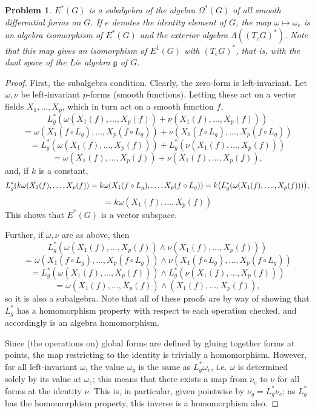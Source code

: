 \documentclass{article}
\newtheorem{plm}{Problem}
\begin{document}

\begin{plm}
  $E^{*}(G)$ is a subalgebra of the algebra $\Omega^{*}(G)$ of all smooth differential forms on $G$.
  If $e$ denotes the identity element of $G$, the map $\omega \mapsto \omega_{e}$ is an algebra isomorphism of $E^{*}(G)$
  and the exterior algebra $\Lambda((T_{e}G)^{*})$.
  Note that this map gives an isomorphism of $E^{1}(G)$ with $(T_{e}G)^{*}$, that is, with the dual space of the Lie algebra $\mathfrak{g}$
  of $G$.
\end{plm}

\begin{proof}
  First, the subalgebra condition.
  Clearly, the zero-form is left-invariant.
  Let $\omega, \nu$ be left-invariant $p$-forms (smooth functions).
  Letting these act on a vector fields $X_{1}, \ldots, X_{p}$, which in turn act on a smooth function $f$,
  \[
    L_{g}^{*}(\omega(X_{1}(f), \ldots, X_{p}(f)) + \nu(X_{1}(f), \ldots, X_{p}(f)))
  \]
  \[
    = \omega(X_{1}(f \circ L_{g}), \ldots, X_{p}(f \circ L_{g})) + \nu(X_{1}(f \circ L_{g}), \ldots, X_{p}(f \circ L_{g}))
  \]
  \[
    = L_{g}^{*}(\omega(X_{1}(f), \ldots, X_{p}(f))) + L_{g}^{*}(\nu(X_{1}(f), \ldots, X_{p}(f)))
  \]
  \[
    = \omega(X_{1}(f), \ldots, X_{p}(f)) + \nu(X_{1}(f), \ldots, X_{p}(f)),
  \]
  and, if $k$ is a constant,
  \[
    L_{g}^{*}(k\omega(X_{1}(f), \ldots, X_{p}(f))
    = k\omega(X_{1}(f \circ L_{g}), \ldots, X_{p}(f \circ L_{g}))
    = k\qty(L_{g}^{*}(\omega(X_{1}(f), \ldots, X_{p}(f))));
  \]
  \[
    = k\omega(X_{1}(f), \ldots, X_{p}(f))
  \]
  This shows that $E^{*}(G)$ is a vector subspace.

  Further, if $\omega, \nu$ are as above,
  then
  \[
    L_{g}^{*}(\omega(X_{1}(f), \ldots, X_{p}(f)) \wedge \nu(X_{1}(f), \ldots, X_{p}(f)))
  \]
  \[
    = \omega(X_{1}(f \circ L_{g}), \ldots, X_{p}(f \circ L_{g})) \wedge \nu(X_{1}(f \circ L_{g}), \ldots, X_{p}(f \circ L_{g}))
  \]
  \[
    = L_{g}^{*}(\omega(X_{1}(f), \ldots, X_{p}(f))) \wedge L_{g}^{*}(\nu(X_{1}(f), \ldots, X_{p}(f)))
  \]
  \[
    = \omega(X_{1}(f), \ldots, X_{p}(f)) \wedge (X_{1}(f), \ldots, X_{p}(f)),
  \]
  so it is also a subalgebra.
  Note that all of these proofs are by way of showing that $L_{g}^{*}$ has a homomorphism property with respect to each operation checked,
  and accordingly is an algebra homomorphism.


  Since (the operations on) global forms are defined by gluing together forms at points,
  the map restricting to the identity is trivially a homomorphism.
  However, for all left-invariant $\omega$, the value $\omega_{g}$ is the same as $L_{g}^{*}\omega_{e}$,
  i.e. $\omega$ is determined solely by its value at $\omega_{e}$; this means that there exists a map from $\nu_{e}$ to $\nu$
  for all forms at the identity $\nu$.
  This is, in particular, given pointwise by $\nu_{g} = L_{g}^{*}\nu_{e}$; as $L_{g}^{*}$ has the homomorphism property,
  this inverse is a homomorphism also.

\end{proof}
\end{document}

